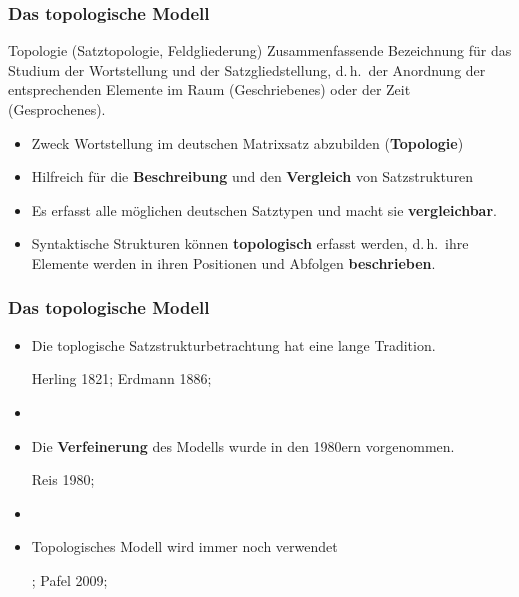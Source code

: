 \begin{frame}
\frametitle{Das topologische Modell}

\begin{block}{Topologie (Satztopologie, Feldgliederung)}
Zusammenfassende Bezeichnung für das Studium der Wortstellung und der Satzgliedstellung, d.\,h.\ der Anordnung der entsprechenden Elemente im Raum (Geschriebenes) oder der Zeit (Gesprochenes). \citep[vgl.][]{Glueck16a, Staffeldt16a} 
\end{block}

\pause 

\begin{itemize}

	\item Zweck \ras Wortstellung im deutschen Matrixsatz abzubilden (\textbf{Topologie})
	\item Hilfreich für die \textbf{Beschreibung} und den \textbf{Vergleich} von Satzstrukturen
	\item Es erfasst alle möglichen deutschen Satztypen und macht sie \textbf{vergleichbar}.
	\item Syntaktische Strukturen können \textbf{topologisch} erfasst werden, d.\,h.\ ihre Elemente werden in ihren Positionen und Abfolgen \textbf{beschrieben}.

\end{itemize}

\end{frame}


\begin{frame}
\frametitle{Das topologische Modell}

\begin{itemize}
	\item Die toplogische Satzstrukturbetrachtung hat eine lange Tradition.
	
	\ras Herling 1821; Erdmann 1886; \textbf{\citealt{Drach39a}}
	
	\item[]
	\item Die \textbf{Verfeinerung} des Modells wurde in den 1980ern vorgenommen. 
	
	\ras Reis 1980; \citealt{Hoehle85a}
	
	\item[]
	
	\item Topologisches Modell wird immer noch verwendet 
	
	\ras \citealt{Ramers06a}; Pafel 2009; \citealt{Woellstein10a} 


\end{itemize}

\end{frame}


